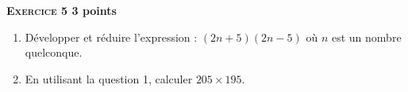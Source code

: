 \textbf{\textsc{Exercice 5} \hfill 3 points}

\medskip
 
\begin{enumerate}
\item Développer et réduire l'expression : $(2n + 5)(2n - 5)$ où $n$ est un nombre quelconque. 
\item En utilisant la question 1, calculer $205 \times 195$. 
\end{enumerate}

\vspace{0,5cm}

